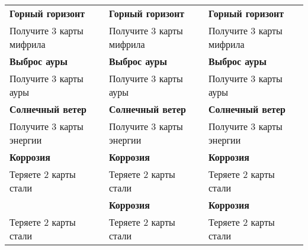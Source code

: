 \documentclass[a4paper,12pt]{article}
\begin{document}
  \begin{tabular}{|p{5cm}|p{5cm}|p{5cm}|}

    \hline
      \textbf{Горный горизонт} & \textbf{Горный горизонт} & \textbf{Горный горизонт} \\
      Получите 3 карты мифрила & Получите 3 карты мифрила & Получите 3 карты мифрила \\

    \hline
      \textbf{Выброс ауры} & \textbf{Выброс ауры} & \textbf{Выброс ауры} \\
      Получите 3 карты ауры & Получите 3 карты ауры & Получите 3 карты ауры \\

    \hline
      \textbf{Солнечный ветер} & \textbf{Солнечный ветер} & \textbf{Солнечный ветер} \\
      Получите 3 карты энергии & Получите 3 карты энергии & Получите 3 карты энергии \\

    \hline
      \textbf{Коррозия} & \textbf{Коррозия} & \textbf{Коррозия} \\
      Теряете 2 карты стали & Теряете 2 карты стали & Теряете 2 карты стали  \\

    \hline
      \textbf{} & \textbf{Коррозия} & \textbf{Коррозия} \\
      Теряете 2 карты стали & Теряете 2 карты стали & Теряете 2 карты стали  \\
    \hline
  \end{tabular}
\end{document}
